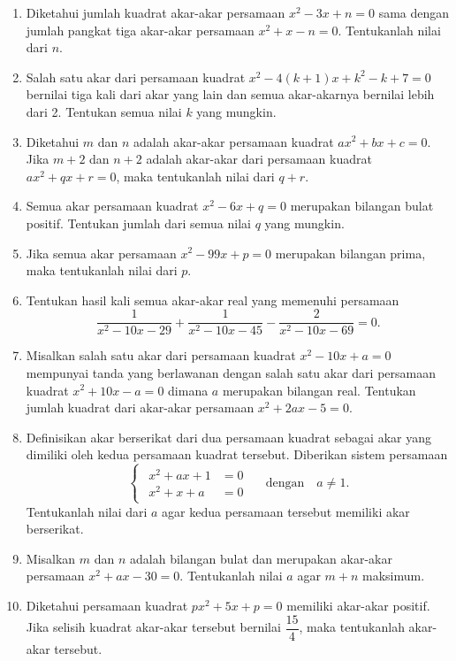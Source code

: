 \begin{enumerate}[topsep=0pt]
		\item Diketahui jumlah kuadrat akar-akar persamaan $ x^{2} - 3x + n = 0 $ sama dengan jumlah pangkat tiga akar-akar persamaan $ x^{2} + x - n = 0 $. Tentukanlah nilai dari $ n $.
		\item Salah satu akar dari persamaan kuadrat $ x^{2} - 4\left(k + 1\right)x + k^{2} - k + 7 = 0 $ bernilai tiga kali dari akar yang lain dan semua akar-akarnya bernilai lebih dari 2. Tentukan semua nilai $ k $ yang mungkin.
		\item Diketahui $ m $ dan $ n $ adalah akar-akar persamaan kuadrat $ ax^{2} + bx + c = 0 $. Jika $ m + 2 $ dan $ n + 2 $ adalah akar-akar dari persamaan kuadrat $ ax^{2} + qx + r = 0 $, maka tentukanlah nilai dari $ q + r $.
		\item Semua akar persamaan kuadrat $ x^{2} - 6x + q = 0 $ merupakan bilangan bulat positif. Tentukan jumlah dari semua nilai $ q $ yang mungkin.
		\item Jika semua akar persamaan $ x^{2} - 99x + p = 0 $ merupakan bilangan prima, maka tentukanlah nilai dari $ p $.
		\item Tentukan hasil kali semua akar-akar real yang memenuhi persamaan
		\[ \frac{1}{x^{2} - 10x - 29} + \frac{1}{x^{2} - 10x - 45} - \frac{2}{x^{2} - 10x - 69} = 0. \]
		\item Misalkan salah satu akar dari persamaan kuadrat $ x^{2} - 10x + a = 0 $ mempunyai tanda yang berlawanan dengan salah satu akar dari persamaan kuadrat $ x^{2} + 10x - a = 0 $ dimana $ a $ merupakan bilangan real. Tentukan jumlah kuadrat dari akar-akar persamaan $ x^{2} + 2ax - 5 = 0 $.
		\item Definisikan akar berserikat dari dua persamaan kuadrat sebagai akar yang dimiliki oleh kedua persamaan kuadrat tersebut. Diberikan sistem persamaan
		\[
			\begin{cases}
				\begin{aligned}
					x^{2} + ax + 1 &= 0 \\
					x^{2} + x + a &= 0
				\end{aligned}
			\end{cases}
			\quad \mbox{dengan} \quad a \ne 1.
		\]
		Tentukanlah nilai dari $ a $ agar kedua persamaan tersebut memiliki akar berserikat.
		\item Misalkan $ m $ dan $ n $ adalah bilangan bulat dan merupakan akar-akar persamaan $ x^{2} + ax - 30 = 0 $. Tentukanlah nilai $ a $ agar $ m + n $ maksimum.
		\item Diketahui persamaan kuadrat $ px^{2} + 5x + p = 0 $ memiliki akar-akar positif. Jika selisih kuadrat akar-akar tersebut bernilai $ \dfrac{15}{4} $, maka tentukanlah akar-akar tersebut.

\end{enumerate}
